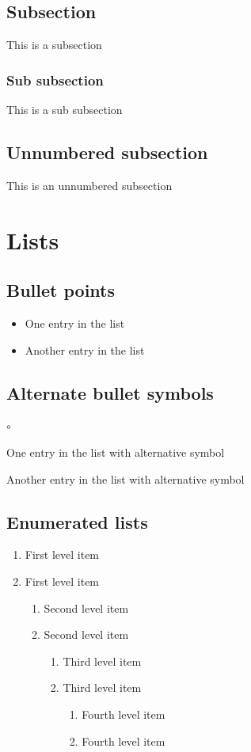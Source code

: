 \documentclass{article}
\begin{document}
    \subsection{Subsection}
    This is a subsection
    \subsubsection{Sub subsection}
    This is a sub subsection
    \subsection*{Unnumbered subsection}
    This is an unnumbered subsection
    
    
\section{Lists}
    \subsection{Bullet points}
        \begin{itemize}
            \item One entry in the list
            \item Another entry in the list
        \end{itemize}
    
    \subsection{Alternate bullet symbols}
        \begin{list}{$\circ$}{}
            \item One entry in the list with alternative symbol
            \item Another entry in the list with alternative symbol
        \end{list}
  
    \subsection{Enumerated lists}
        \begin{enumerate}
   \item First level item
   \item First level item
   \begin{enumerate}
     \item Second level item
     \item Second level item
     \begin{enumerate}
       \item Third level item
       \item Third level item
       \begin{enumerate}
         \item Fourth level item
         \item Fourth level item
       \end{enumerate}
     \end{enumerate}
   \end{enumerate}
 \end{enumerate}
\end{document}

